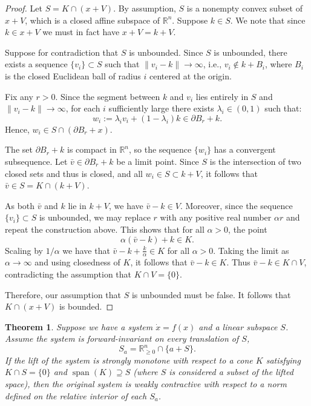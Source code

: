\documentclass{article}
\newtheorem{thm}{Theorem}
\begin{document}
\begin{proof}
Let \( S = K \cap (x + V) \). By assumption, \( S \) is a nonempty convex subset of \( x + V \), which is a closed affine subspace of \( \mathbb{R}^n \). Suppose $k \in S$. We note that since $k \in x + V$ we must in fact have $x + V = k + V$. 



Suppose for contradiction that \( S \) is unbounded.  Since $S$ is unbounded,  there exists a sequence \( \{v_i\} \subset S \) such that \( \|v_i - k\| \to \infty \), i.e., \( v_i \notin k + B_i \), where \( B_i \) is the closed Euclidean ball of radius \( i \) centered at the origin.

Fix any \( r > 0 \). Since the segment between \( k \) and \( v_i \) lies entirely in \( S \) and \( \|v_i - k\| \to \infty \), for each \( i \) sufficiently large there exists \( \lambda_i \in (0,1) \) such that:
\[
w_i := \lambda_i v_i + (1 - \lambda_i)k \in \partial B_r + k.
\]
Hence, \( w_i \in S \cap (\partial B_r + x) \).

The set \( \partial B_r + k \) is compact in \( \mathbb{R}^n \), so the sequence \( \{w_i\} \) has a convergent subsequence. Let \( \bar{v} \in \partial B_r + k \) be a limit point. Since \( S \) is the intersection of two closed sets and thus is closed, and all \( w_i \in S \subset k + V \), it follows that \( \bar{v} \in S = K \cap (k + V) \).

As both \( \bar{v} \) and \( k \) lie in \( k + V \), we have \( \bar{v} - k \in V \). Moreover, since the sequence \( \{v_i\} \subset S \) is unbounded, we may replace \( r \) with any positive real number \( \alpha r \) and repeat the construction above. This shows that for all \( \alpha > 0 \), the point
\[
\alpha(\bar{v} - k) + k \in K.
\]
Scaling by $1/\alpha$ we have that \( \bar{v} - k + \frac{k}{\alpha} \in K \) for all $\alpha > 0$. Taking the limit as \( \alpha \to \infty \) and using closedness of \( K \), it follows that \( \bar{v} - k \in K \). Thus \( \bar{v} - k \in K \cap V \), contradicting the assumption that \( K \cap V = \{0\} \).

Therefore, our assumption that \( S \) is unbounded must be false. It follows that \( K \cap (x + V) \) is bounded.
\end{proof}



\setcounter{thm}{1}




\begin{thm}
\label{thm:strongly_monotone_lift_to_weakly contractive_general_2}
Suppose we have a system $\dot{x} = f(x)$ and a linear subspace $S$. Assume the system is forward-invariant on every translation of $S$,
\[
S_a = \mathbb{R}^n_{\geq 0} \cap \{a + S\}.
\]
If the lift of the system is strongly monotone with respect to a cone \( K \) satisfying \( K \cap S = \{0 \} \) and \( \operatorname{span}(K) \supseteq S \) (where $S$ is considered a subset of the lifted space), then the original system is weakly contractive with respect to a norm defined on the relative interior of each \( S_a \).
\end{thm}
\end{document}
